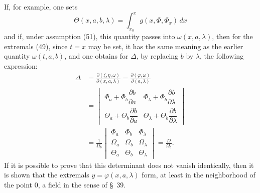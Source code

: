 \documentclass[11pt,a4paper,leqno]{article}
\begin{document}
If, for example, one sets
\[
\Theta(x,a,b,\lambda)=\int_{x_0}^{x}g(x,\Phi,\Phi_x)\,dx
\]
and if, under assumption (51), this quantity passes into $\omega(x,a,\lambda)$, then for the extremals (49), since $t=x$ may be set, it has the same meaning as the earlier quantity $\omega(t,a,b)$, and one obtains for $\Delta$, by replacing $b$ by $\lambda$, the following expression:
\[
\begin{aligned}
\Delta&=\frac{\partial(\xi,\eta,\omega)}{\partial(x,a,\lambda)}
=\frac{\partial(\varphi,\omega)}{\partial(a,\lambda)} \\
&=\begin{vmatrix}
\Phi_a+\Phi_b\dfrac{\partial b}{\partial a}&\Phi_\lambda+\Phi_b\dfrac{\partial b}{\partial\lambda}\\[1.0ex]
\Theta_a+\Theta_b\dfrac{\partial b}{\partial a}&\Theta_\lambda+\Theta_b\dfrac{\partial b}{\partial\lambda}
\end{vmatrix}\\
&=\frac{1}{\Omega_b}\begin{vmatrix}
\Phi_a&\Phi_b&\Phi_\lambda\\
\Omega_a&\Omega_b&\Omega_\lambda\\
\Theta_a&\Theta_b&\Theta_\lambda
\end{vmatrix}=\frac{D}{\Omega_b}.
\end{aligned}
\]
If it is possible to prove that this determinant does not vanish identically, then it is shown that the extremals $y=\varphi(x,a,\lambda)$ form, at least in the neighborhood of the point 0, a field in the sense of \S~39.
\end{document}
